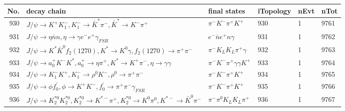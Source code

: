 \begin{table}[htbp] 
\begin{center}
\begin{small}
\begin{tabular}{rlllll}\hline\hline
 No. & decay chain & final states &  iTopology & nEvt & nTot \\\hline
930&$J/\psi       \rightarrow K^{+}          K_{1}^{-}      , K_{1}^{-}       \rightarrow \bar{K}^{*}   \pi^{-}        , \bar{K}^{*}    \rightarrow K^{-}          \pi^{+}        $&$\pi^{-}        K^{-}          \pi^{+}        K^{+}          $&  930&    1& 9761\\
931&$J/\psi       \rightarrow \eta          \bar{n}          n                 , \eta           \rightarrow \gamma       e^{-}        e^{+}        \gamma_{FSR} $&$e^{-}        \bar{n}          e^{+}        n                 \gamma       $&  931&    1& 9762\\
932&$J/\psi       \rightarrow K^{*}          \bar{K}^{0}   f_{2}(1270)    , K^{*}           \rightarrow K^{0}          \gamma       , f_{2}(1270)     \rightarrow \pi^{+}        \pi^{-}        $&$\pi^{-}        K_{L}          K_{L}          \pi^{+}        \gamma       $&  932&    1& 9763\\
933&$J/\psi       \rightarrow a_{0}^{+}      K^{-}          K^{*}          , a_{0}^{+}       \rightarrow \eta          \pi^{+}        , K^{*}           \rightarrow K^{+}          \pi^{-}        , \eta           \rightarrow \gamma       \gamma       $&$\pi^{-}        K^{-}          \pi^{+}        \gamma       \gamma       K^{+}          $&  933&    1& 9764\\
934&$J/\psi       \rightarrow K_{1}^{-}      K^{+}          , K_{1}^{-}       \rightarrow \rho^{0}      K^{-}          , \rho^{0}       \rightarrow \pi^{+}        \pi^{-}        $&$\pi^{-}        K^{-}          \pi^{+}        K^{+}          $&  934&    1& 9765\\
935&$J/\psi       \rightarrow \phi           f^{'}_{0}     , \phi            \rightarrow K^{+}          K^{-}          , f^{'}_{0}      \rightarrow \pi^{+}        \pi^{-}        \gamma_{FSR} $&$\pi^{-}        K^{-}          \pi^{+}        K^{+}          $&  935&    1& 9766\\
936&$J/\psi       \rightarrow K_2^{*0}       K_2^{*0}       , K_2^{*0}        \rightarrow K^{*-}         \pi^{+}        , K_2^{*0}        \rightarrow K^{0}          \pi^{0}        , K^{*-}          \rightarrow \bar{K}^{0}   \pi^{-}        $&$\pi^{-}        \pi^{0}        K_{L}          K_{L}          \pi^{+}        $&  936&    1& 9767\\

\end{tabular}
\end{small}
\end{center}
\end{table}
